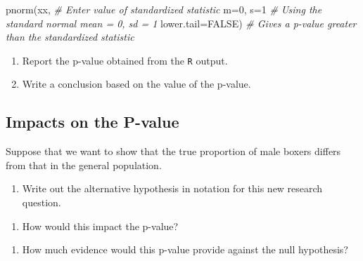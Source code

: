 \documentclass[
]{report}
\newenvironment{Shaded}{\begin{snugshade}}{\end{snugshade}}
\newcommand{\AttributeTok}[1]{\textcolor[rgb]{0.77,0.63,0.00}{#1}}
\newcommand{\CommentTok}[1]{\textcolor[rgb]{0.56,0.35,0.01}{\textit{#1}}}
\newcommand{\ConstantTok}[1]{\textcolor[rgb]{0.00,0.00,0.00}{#1}}
\newcommand{\DecValTok}[1]{\textcolor[rgb]{0.00,0.00,0.81}{#1}}
\newcommand{\FunctionTok}[1]{\textcolor[rgb]{0.00,0.00,0.00}{#1}}
\newcommand{\NormalTok}[1]{#1}
\providecommand{\tightlist}{%
  \setlength{\itemsep}{0pt}\setlength{\parskip}{0pt}}
\begin{document}
\begin{Shaded}
\begin{Highlighting}[]
\FunctionTok{pnorm}\NormalTok{(xx, }\CommentTok{\# Enter value of standardized statistic}
      \AttributeTok{m=}\DecValTok{0}\NormalTok{, }\AttributeTok{s=}\DecValTok{1} \CommentTok{\# Using the standard normal mean = 0, sd = 1}
      \AttributeTok{lower.tail=}\ConstantTok{FALSE}\NormalTok{) }\CommentTok{\# Gives a p{-}value greater than the standardized statistic}
\end{Highlighting}
\end{Shaded}

\begin{enumerate}
\def\labelenumi{\arabic{enumi}.}
\setcounter{enumi}{8}
\item
  Report the p-value obtained from the \texttt{R} output.
  \vspace{0.2in}
\item
  Write a conclusion based on the value of the p-value.
  \vspace{0.8in}
\end{enumerate}

\hypertarget{impacts-on-the-p-value}{%
\subsection{Impacts on the P-value}\label{impacts-on-the-p-value}}

Suppose that we want to show that the true proportion of male boxers differs from that in the general population.

\begin{enumerate}
\def\labelenumi{\arabic{enumi}.}
\setcounter{enumi}{10}
\tightlist
\item
  Write out the alternative hypothesis in notation for this new research question.
\end{enumerate}

\vspace{0.5in}

\begin{enumerate}
\def\labelenumi{\arabic{enumi}.}
\setcounter{enumi}{11}
\tightlist
\item
  How would this impact the p-value?
\end{enumerate}

\vspace{0.2in}

\begin{enumerate}
\def\labelenumi{\arabic{enumi}.}
\setcounter{enumi}{12}
\tightlist
\item
  How much evidence would this p-value provide against the null hypothesis?
\end{enumerate}
\end{document}
